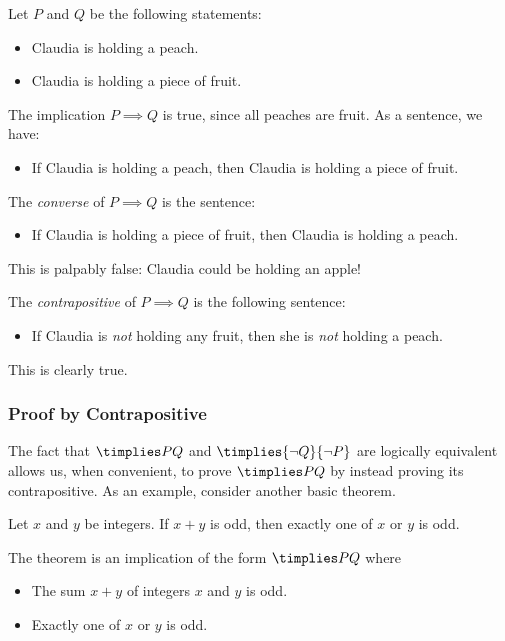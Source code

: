 \begin{example}
Let $P$ and $Q$ be the following statements:
\begin{itemize}\setlength{\itemsep}{0pt}
  \item[] Claudia is holding a peach.
  \item[] Claudia is holding a piece of fruit.
\end{itemize}
The implication $P\implies Q$ is true, since all peaches are fruit. As a sentence, we have:
\begin{itemize}\setlength{\itemsep}{0pt}
  \item[]If Claudia is holding a peach, then Claudia is holding a piece of fruit.
\end{itemize}
The \emph{converse} of $P\implies Q$ is the sentence:
\begin{itemize}\setlength{\itemsep}{0pt}
  \item[]If Claudia is holding a piece of fruit, then Claudia is holding a peach.
\end{itemize}
This is palpably false: Claudia could be holding an apple!\\\pagebreak[2]

\noindent The \emph{contrapositive} of $P\implies Q$ is the following sentence:
\begin{itemize}\setlength{\itemsep}{0pt}
  \item[]If Claudia is \emph{not} holding any fruit, then she is \emph{not} holding a peach.
\end{itemize}
This is clearly true.
\end{example}



\subsubsection*{Proof by Contrapositive}

The fact that $\timplies PQ$ and $\timplies{\neg Q}{\neg P}$ are logically equivalent allows us, when convenient, to prove $\timplies PQ$ by instead proving its contrapositive. As an example, consider another basic theorem.

\begin{thm}
Let $x$ and $y$ be integers. If $x+y$ is odd, then exactly one of $x$ or $y$ is odd.
\end{thm}

\noindent The theorem is an implication of the form $\timplies PQ$ where
\begin{itemize}\setlength{\itemsep}{0pt}
  \item[] The sum $x+y$ of integers $x$ and $y$ is odd.
  \item[] Exactly one of $x$ or $y$ is odd.
\end{itemize}

